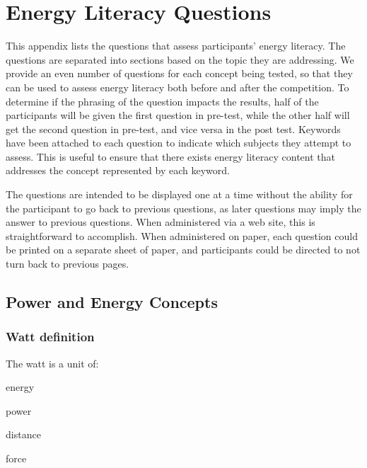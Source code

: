 \chapter{Energy Literacy Questions}
\label{app:energy-literacy}

This appendix lists the questions that assess participants' energy literacy. The questions are separated into sections based on the topic they are addressing. We provide an even number of questions for each concept being tested, so that they can be used to assess energy literacy both before and after the competition. To determine if the phrasing of the question impacts the results, half of the participants will be given the first question in pre-test, while the other half will get the second question in pre-test, and vice versa in the post test. Keywords have been attached to each question to indicate which subjects they attempt to assess. This is useful to ensure that there exists energy literacy content that addresses the concept represented by each keyword.

The questions are intended to be displayed one at a time without the ability for the participant to go back to previous questions, as later questions may imply the answer to previous questions. When administered via a web site, this is straightforward to accomplish. When administered on paper, each question could be printed on a separate sheet of paper, and participants could be directed to not turn back to previous pages.

\section{Power and Energy Concepts}

\subsection{Watt definition}

\begin{question}
	\item The watt is a unit of:
\end{question}

\begin{answer}
	\item energy
	\item power
	\item distance
	\item force
\end{answer}

